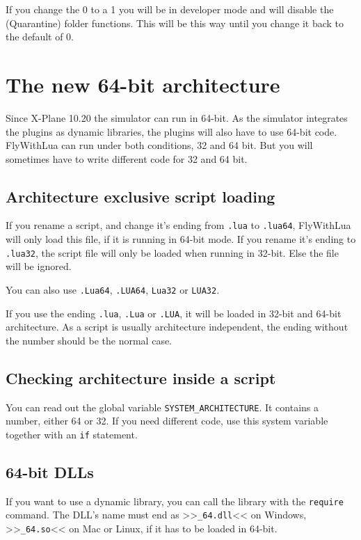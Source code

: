 \documentclass[11pt,parskip=half,a4paper]{scrartcl}
\begin{document}
If you change the 0 to a 1 you will be in developer mode and will disable the (Quarantine) folder
functions. This will be this way until you change it back to the default of 0.




\newpage
\section{The new 64-bit architecture}

Since X-Plane 10.20 the simulator can run in 64-bit. As the simulator integrates the plugins as dynamic libraries, the plugins will also have to use 64-bit code. FlyWithLua can run under both conditions, 32 and 64 bit. But you will sometimes have to write different code for 32 and 64 bit.

\subsection{Architecture exclusive script loading}

If you rename a script, and change it's ending from \verb|.lua| to \verb|.lua64|, FlyWithLua will only load this file, if it is running in 64-bit mode. If you rename it's ending to \verb|.lua32|, the script file will only be loaded when running in 32-bit. Else the file will be ignored.

You can also use \verb|.Lua64|, \verb|.LUA64|, \verb|Lua32| or \verb|LUA32|.

If you use the ending \verb|.lua|, \verb|.Lua| or \verb|.LUA|, it will be loaded in 32-bit and 64-bit architecture. As a script is usually architecture independent, the ending without the number should be the normal case.

\subsection{Checking architecture inside a script}

You can read out the global variable \verb|SYSTEM_ARCHITECTURE|. It contains a number, either 64 or 32. If you need different code, use this system variable together with an \verb|if| statement.

\subsection{64-bit DLLs}

If you want to use a dynamic library, you can call the library with the \verb|require| command. The DLL's name must end as >>\verb|_64.dll|<< on Windows, >>\verb|_64.so|<< on Mac or Linux, if it has to be loaded in 64-bit.
\end{document}
